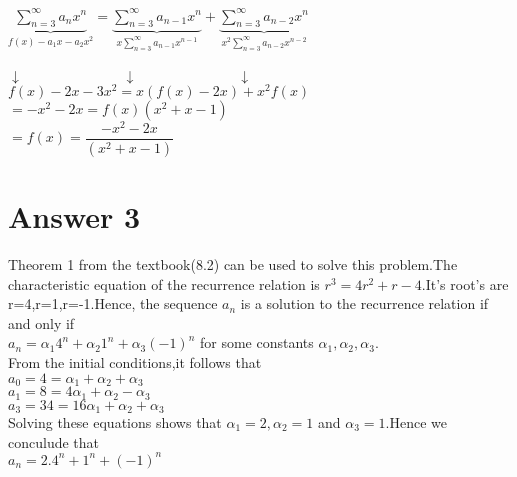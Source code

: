 \documentclass[12pt]{article}
\begin{document}
	$ \underbrace{ \sum_{n=3}^{\infty} a_nx^n}_{f(x)-a_1x-a_2x^2 } = \underbrace{\sum_{n=3}^{\infty} a_{n-1}x^n}_{x \sum_{n=3}^{\infty} a_{n-1}x^{n-1}} +  \underbrace{ \sum_{n=3}^{\infty} a_{n-2}x^n}_{x^2 \sum_{n=3}^{\infty} a_{n-2}x^{n-2}} $\\ \\
	\hspace*{1cm} $\downarrow \hspace{3cm} \downarrow \hspace{3cm} \downarrow $\\
	\hspace*{0.5cm} $ f(x)-2x-3x^2 = x(f(x)-2x) + x^2f(x)$\\
	\hspace*{0.5cm} $ = -x^2-2x = f(x)(x^2+x-1)$\\
	\hspace*{0.5cm} $ = f(x)=\dfrac{-x^2-2x}{(x^2+x-1)}$\\
	
	
	\section*{Answer 3}
	Theorem 1 from the textbook(8.2) can be used to solve this problem.The characteristic equation of the recurrence relation is $ r^{3} = 4r^2 + r -4.$It's root's are r=4,r=1,r=-1.Hence, the sequence $a_{n}$ is a solution to the recurrence relation if and only if \\
	\hspace*{3cm}	$ a_n = \alpha_1 4^n + \alpha_2 1^n+\alpha_3 (-1)^n$ for some constants $\alpha_1 ,\alpha_2,\alpha_3$.\\
	From the initial conditions,it follows that \\
	\hspace*{3cm} $a_0=4=\alpha_1 +\alpha_2+\alpha_3$\\
	\hspace*{3cm} $a_1=8=4\alpha_1 +\alpha_2-\alpha_3$\\
	\hspace*{3cm} $a_3=34=16\alpha_1 +\alpha_2+\alpha_3$\\
	Solving these equations shows that  $\alpha_1=2 ,\alpha_2=1$ and $\alpha_3=1$.Hence we conculude that\\
	\hspace*{3cm}	$ a_n = 2.4^n +  1^n+ (-1)^n$ 
\end{document}
